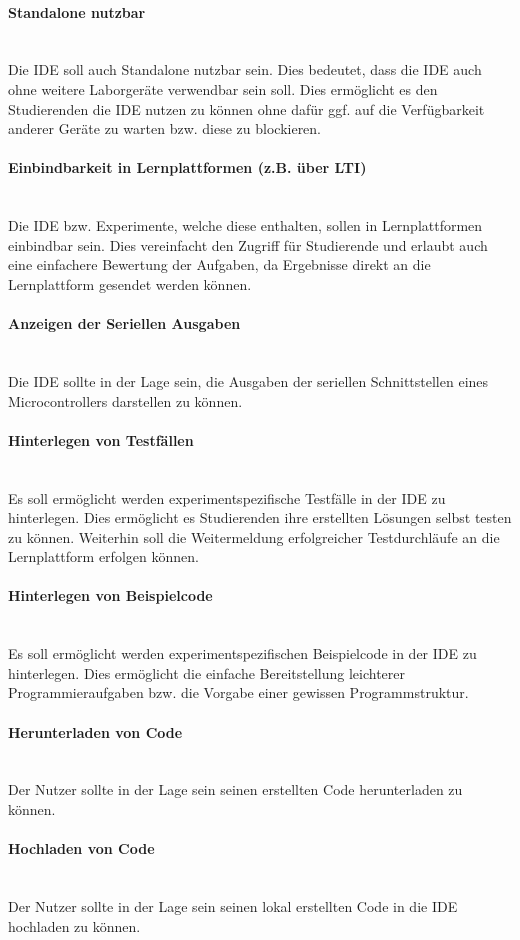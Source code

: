 \paragraph{Standalone nutzbar} \mbox{} \\
Die IDE soll auch Standalone nutzbar sein. Dies bedeutet, dass die IDE auch ohne weitere Laborgeräte verwendbar sein soll. Dies ermöglicht es den Studierenden die IDE nutzen zu können ohne dafür ggf. auf die Verfügbarkeit anderer Geräte zu warten bzw. diese zu blockieren.

\paragraph{Einbindbarkeit in Lernplattformen (z.B. über LTI)} \mbox{} \\
Die IDE bzw. Experimente, welche diese enthalten, sollen in Lernplattformen einbindbar sein. Dies vereinfacht den Zugriff für Studierende und erlaubt auch eine einfachere Bewertung der Aufgaben, da Ergebnisse direkt an die Lernplattform gesendet werden können.

\paragraph{Anzeigen der Seriellen Ausgaben} \mbox{} \\
Die IDE sollte in der Lage sein, die Ausgaben der seriellen Schnittstellen eines Microcontrollers darstellen zu können.

\paragraph{Hinterlegen von Testfällen} \mbox{} \\
Es soll ermöglicht werden experimentspezifische Testfälle in der IDE zu hinterlegen. Dies ermöglicht es Studierenden ihre erstellten Lösungen selbst testen zu können. Weiterhin soll die Weitermeldung erfolgreicher Testdurchläufe an die Lernplattform erfolgen können.

\paragraph{Hinterlegen von Beispielcode} \mbox{} \\
Es soll ermöglicht werden experimentspezifischen Beispielcode in der IDE zu hinterlegen. Dies ermöglicht die einfache Bereitstellung leichterer Programmieraufgaben bzw. die Vorgabe einer gewissen Programmstruktur.

\paragraph{Herunterladen von Code} \mbox{} \\
Der Nutzer sollte in der Lage sein seinen erstellten Code herunterladen zu können. 

\paragraph{Hochladen von Code} \mbox{} \\
Der Nutzer sollte in der Lage sein seinen lokal erstellten Code in die IDE hochladen zu können.